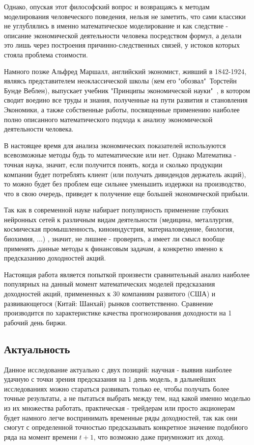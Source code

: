 	Однако, опуская этот философский вопрос и возвращаясь к методам моделирования человеческого поведения, нельзя не заметить, что сами классики не углублялись в именно математическое моделирование и как следствие - описание экономической деятельности человека посредством формул, а делали это лишь через построения причинно-следственных связей, у истоков которых стояла проблема стоимости. 
	
	Намного позже Альфред Маршалл, английский экономист, живший в 1842-1924, являясь представителем неоклассической школы (кем его "обозвал"\ Торстейн Бунде Веблен), выпускает учебник "Принципы экономической науки"\ \cite{alfred_marshall}, в котором сводит воедино все труды и знания, полученные на пути развития и становления Экономики, а также собственные работы, посвященные применению наиболее полно описанного математического подхода к анализу экономической деятельности человека. 
	
	В настоящее время для анализа экономических показателей используются всевозможные методы будь то математические или нет. Однако Математика - точная наука, значит, если получится понять, когда и сколько продукции компании будет потреблять клиент (или получать дивидендов держатель акций), то можно будет без проблем еще сильнее уменьшить издержки на производство, что в свою очередь, приведет к получение еще большей экономической прибыли. 
	
	Так как в современной науке набирает популярность применение глубоких нейронных сетей к различным видам деятельности (медицина, металлургия, космическая промышленность, киноиндустрия, материаловедение, биология, биохимия, ...) \cite{nn_all_over_us}, значит, не лишнее - проверить, а имеет ли смысл вообще применять данные методы к финансовым задачам, а конкретно именно к предсказанию доходностей акций. 
	
	Настоящая работа является попыткой произвести сравнительный анализ наиболее популярных на данный момент математических моделей предсказания доходностей акций, примененных к 30 компаниям развитого (США) и развивающегося (Китай: Шанхай) рынков соответственно. Сравнение производится по характеристике качества прогнозирования доходности на 1 рабочий день биржи.
	\subsection{Актуальность}
		Данное исследование актуально с двух позиций: научная - выявив наиболее удачную с точки зрения предсказания на 1 день модель, в дальнейших исследованиях можно стараться развивать только ее, чтобы получать более точные результаты, а не пытаться выбрать между тем, над какой именно моделью из их множества работать, практическая - трейдерам или просто акционерам будет намного легче воспринимать временные ряды доходностей, так как они смогут с определенной точностью предсказывать конкретное значение подобного ряда на момент времени $t + 1$, что возможно даже приумножит их доход.
